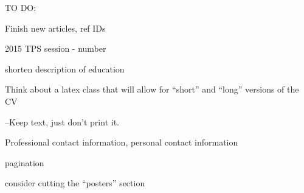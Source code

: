 TO DO:

Finish new articles, ref IDs

2015 TPS session - number

shorten description of education

Think about a latex class that will allow for ``short'' and ``long'' versions of the CV

--Keep text, just don't print it.

Professional contact information, personal contact information

pagination

consider cutting the ``posters'' section



